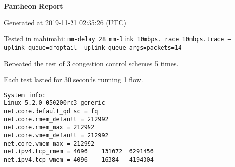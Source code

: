 \documentclass{article}
\begin{document}
\centerline{\textbf{\large{Pantheon Report}}}
\vspace{20pt}

Generated at 2019-11-21 02:35:26 (UTC).

Tested in mahimahi: \texttt{mm-delay 28 mm-link 10mbps.trace 10mbps.trace --uplink-queue=droptail --uplink-queue-args=packets=14}

Repeated the test of 3 congestion control schemes 5 times.

Each test lasted for 30 seconds running 1 flow.

\begin{verbatim}
System info:
Linux 5.2.0-050200rc3-generic
net.core.default_qdisc = fq
net.core.rmem_default = 212992
net.core.rmem_max = 212992
net.core.wmem_default = 212992
net.core.wmem_max = 212992
net.ipv4.tcp_rmem = 4096	131072	6291456
net.ipv4.tcp_wmem = 4096	16384	4194304
\end{verbatim}
\end{document}
